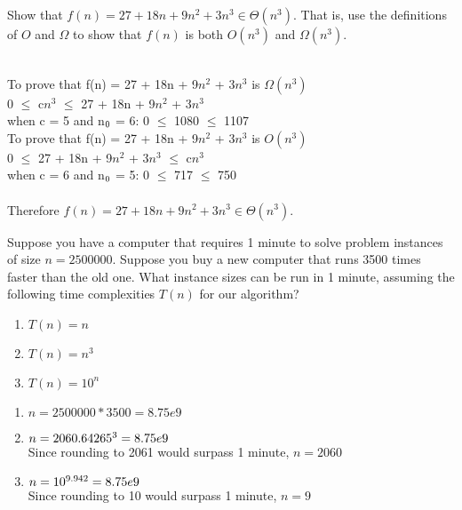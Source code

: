 \documentclass[addpoints,11pt]{exam}
\begin{document}
	
	\begin{questions}
		\question[5]
		Show that $f(n) = 27 + 18n + 9n^2 + 3n^3 \in \Theta(n^3)$.  That is, use the definitions of $O$ and $\Omega$ to show that $f(n)$ is both $O(n^3)$ and $\Omega(n^3)$. 
		\begin{solutionorbox} \\
			To prove that f(n) = 27 + 18n + 9$n^2$ + 3$n^3$ is $\Omega(n^3)$ \\
			0 $\leq$ c$n^3$ $\leq$ 27 + 18n + 9$n^2$ + 3$n^3$\\ when c = 5 and n$\textsubscript{0}$ = 6:
			0 $\leq$ 1080 $\leq$ 1107\\
			To prove that f(n) = 27 + 18n + 9$n^2$ + 3$n^3$ is $O(n^3)$ \\
			0 $\leq$ 27 + 18n + 9$n^2$ + 3$n^3$ $\leq$ c$n^3$\\ when c = 6 and n$\textsubscript{0}$ = 5:
			0 $\leq$ 717 $\leq$ 750 \\ \\
			Therefore $f(n) = 27 + 18n + 9n^2 + 3n^3 \in \Theta(n^3)$.
		\end{solutionorbox}
		
		\ifprintanswers
		\newpage
		\else
		\bigskip
		\fi
		
		
		\question[5]
		Suppose you have a computer that requires 1 minute to solve problem instances of size $n=2500000$.  Suppose you buy a new computer that runs 3500 times faster than the old one.  What instance sizes can be run in 1 minute, assuming the following time complexities $T(n)$ for our algorithm?
		\begin{enumerate}[label=(\alph*)]
			\item $T(n) = n$
			\item $T(n) = n^3$
			\item $T(n) = 10^n$
		\end{enumerate}
		\begin{solutionorbox}
			\begin{enumerate}[label=(\alph*)]
				\item $n = 2500000 * 3500 = 8.75e9$
				\item $n = 2060.64265\textsuperscript{3} = 8.75e9$\\
				Since rounding to 2061 would surpass 1 minute, $n = 2060$
				\item $n = 10\textsuperscript{9.942} = 8.75e9$\\
				Since rounding to 10 would surpass 1 minute, $n = 9$
			\end{enumerate}
		\end{solutionorbox}
		

\end{questions}
\end{document}
